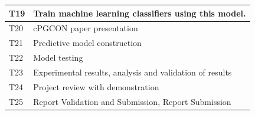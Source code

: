 \documentclass[oneside,a4paper,12pt]{pictreport}
\begin{document}
\begin{table}[]
\begin{tabular}{|l|l|}
T19                  & Train machine learning classifiers using this model.
 \\ \hline
T20                  & cPGCON paper presentation
 \\ \hline
T21                  & Predictive model construction \\ \hline
T22                  & Model testing \\ \hline
T23                  & Experimental results, analysis and validation of results \\ \hline
T24                  & Project review with demonstration
 \\ \hline
T25                  &Report Validation and Submission, Report Submission
 \\ \hline
\end{tabular}
\end{table}
\end{document}

